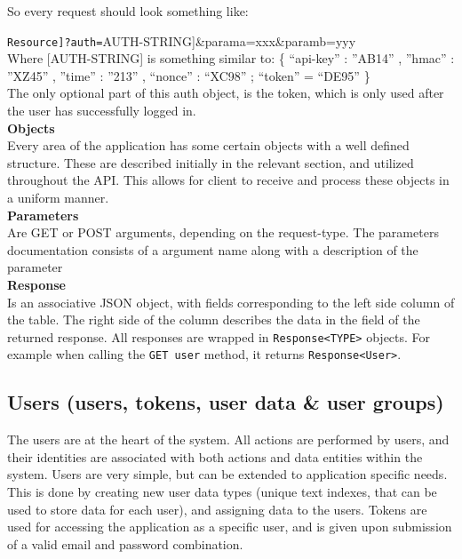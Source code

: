 \documentclass[11pt]{article}
\begin{document}
So every request should look something like: 

\verb[Resource]?auth=[AUTH-STRING]\&parama=xxx\&paramb=yyy \\

Where [AUTH-STRING] is something similar to:
\{ “api-key” : ”AB14” , ”hmac” : ”XZ45” , ”time” : ”213” , “nonce” : “XC98” ; “token” = “DE95” \} \\

The only optional part of this auth object, is the token, which is only used after the user has successfully logged in. \\

\textbf{Objects} \\
Every area of the application has some certain objects with a well defined structure. These are described initially in the relevant section, and utilized throughout the API. This allows for client to receive and process these objects in a uniform manner.\\

\textbf{Parameters} \\
Are GET or POST arguments, depending on the request-type. The parameters documentation consists of a argument name along with a description of the parameter \\

\textbf{Response} \\
Is an associative JSON object, with fields corresponding to the left side column of the table. The right side of the column describes the data in the field of the returned response.
All responses are wrapped in \texttt{Response<TYPE>} objects. For example when calling the \texttt{GET user} method, it returns \texttt{Response<User>}.

\subsection{Users (users, tokens, user data \& user groups)}

The users are at the heart of the system. All actions are performed by users, and their identities are associated with both actions and data entities within the system. Users are very simple, but can be extended to application specific needs. This is done by creating new user data types (unique text indexes, that can be used to store data for each user), and assigning data to the users. Tokens are used for accessing the application as a specific user, and is given upon submission of a valid email and password combination.
\end{document}
